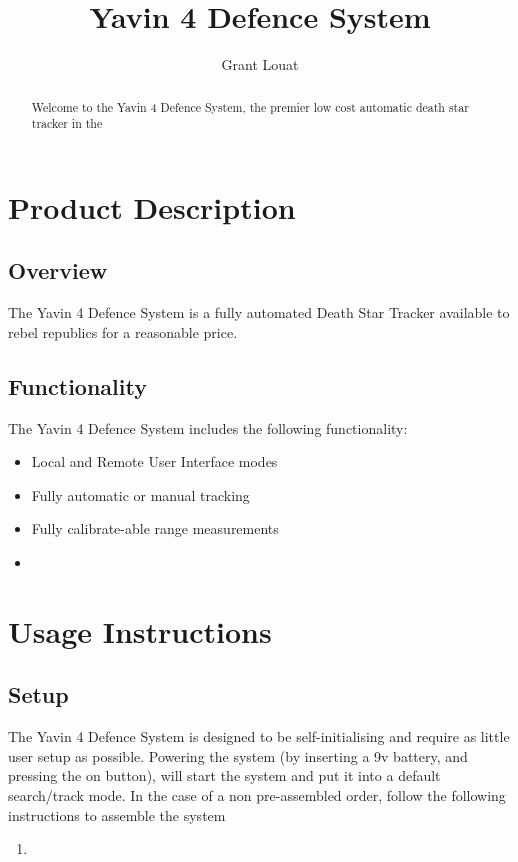 \documentclass[]{report}
\title{Yavin 4 Defence System}
\author{Grant Louat}
\begin{document}
\maketitle

\begin{abstract}
Welcome to the Yavin 4 Defence System, the premier low cost automatic death star tracker in the 
\end{abstract}

\chapter{Product Description}
\section{Overview}
The Yavin 4 Defence System is a fully automated Death Star Tracker available to rebel republics for a reasonable price. 

\section{Functionality}
The Yavin 4 Defence System includes the following functionality:

\begin{itemize}
	\item Local and Remote User Interface modes
	\item Fully automatic or manual tracking
	\item Fully calibrate-able range measurements
	\item  
\end{itemize}

\chapter{Usage Instructions}
\section{Setup}
The Yavin 4 Defence System is designed to be self-initialising and require as little user setup as possible. Powering the system (by inserting a 9v battery, and pressing the on button), will start the system and put it into a default search/track mode. \newline
In the case of a non pre-assembled order, follow the following instructions to assemble the system \newline
\begin{enumerate}
	\item 
\end{enumerate}
\end{document}
